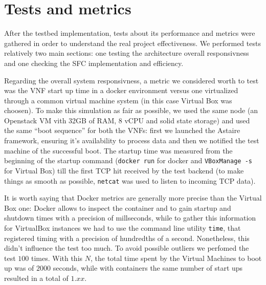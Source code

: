 \chapter{Tests and metrics}

After the testbed implementation, tests about its performance and metrics were 
gathered in order to understand the real project effectiveness. We performed 
tests relatively two main sections: one testing the architecture 
overall responsivness and one checking the SFC implementation and efficiency.

Regarding the overall system responsivness, a metric we considered worth to 
test was the VNF start up time in a docker environment versus one virtualized 
through a common virtual machine system (in this case Virtual Box was choosen). 
To make this simulation as fair as possible, we used the same node (an 
Openstack VM vith 32GB of RAM, 8 vCPU and solid state storage) and used the same 
``boot sequence'' for both the VNFs: first we launched the Astaire framework, 
ensuring it's availability to process data and then we notified the test 
machine of the successful boot. The startup time was measured from the 
beginning of the startup command (\verb!docker run! for docker and 
\verb!VBoxManage -s! for Virtual Box) till the first TCP hit received by the 
test backend (to make things as smooth as possible, \verb!netcat! was used 
to listen to incoming TCP data).

It is worth saying that Docker metrics are generally more precise than the 
Virtual Box one: Docker allows to inspect the container and to gain startup and 
shutdown times with a precision of millseconds, while to gather this 
information for VirtualBox instances we had to use the command line utility 
\verb!time!, that registered timing with a precision of hundredths of a 
second. Nonetheless, this didn't influence the test too much. To avoid possible 
outliers we perfomed the test $100$ times. With this $N$, the total time spent 
by the Virtual Machines to boot up was of $2000$ seconds, while with containers the same number of start ups resulted in a 
total of $1.xx$. %


